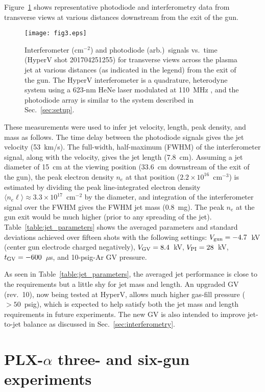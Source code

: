 \documentclass[journal]{IEEEtran}
\begin{document}
Figure~\ref{fig:single_jet_data} shows representative photodiode and interferometry data
from transverse views at various distances downstream from the exit of the gun.
\begin{figure}[!b]
\centering
\texttt{[image: fig3.eps]}
\caption{Interferometer (cm$^{-2}$) and photodiode (arb.)\ signals vs.\ time (HyperV shot 201704251255)
for transverse views across the plasma
jet at various distances (as indicated in the legend) from the exit of the gun.  The HyperV
interferometer is a quadrature, heterodyne system using a 623-nm HeNe laser modulated at
 110~MHz \cite{case10}, and the photodiode array is similar to the system described 
 in Sec.~\ref{sec:setup}.}
\label{fig:single_jet_data}
\end{figure}  
These measurements were used to infer jet velocity, length, peak density, and mass as follows.
The time delay between the photodiode signals gives the jet velocity (53~km/s).  The
full-width, half-maximum (FWHM) of the interferometer signal, along with the velocity, 
gives the jet length (7.8~cm).
Assuming a jet diameter of 15~cm at the viewing position (33.6~cm downstream
of the exit of the gun), the peak electron
density $n_e$ at that position ($2.2 \times 10^{16}$~cm$^{-3}$)
is estimated by dividing the peak line-integrated electron density
$\langle n_e \ell\rangle \approx 3.3\times 10^{17}$~cm$^{-2}$ by the diameter, and integration of the 
interferometer signal over the FWHM gives the FWHM jet mass (0.8~mg).  The peak $n_e$
at the gun exit would be much higher (prior to any spreading of the jet).  
Table~\ref{table:jet_parameters} shows
the averaged parameters and standard
deviations achieved over fifteen shots with the following settings:  
$V_{\rm gun}=-4.7$~kV (center gun electrode charged
negatively), $V_{\rm GV}=8.4$~kV, $V_{\rm PI}=28$~kV,
$t_{\rm GV}= -600$~$\mu$s, and 10-psig-Ar GV pressure.

As seen in Table~\ref{table:jet_parameters}, the averaged
jet performance is close to the requirements but a little shy for jet mass and length.
An upgraded
GV (rev.~10), now being tested at HyperV,
allows much higher gas-fill pressure ($>50$~psig), which is expected
to help satisfy both the jet mass and length requirements in future experiments.
The new GV is also intended to improve jet-to-jet balance as discussed in 
Sec.~\ref{sec:interferometry}.

\section{PLX-$\alpha$ three- and six-gun experiments}
\label{sec:six_gun}
\end{document}
